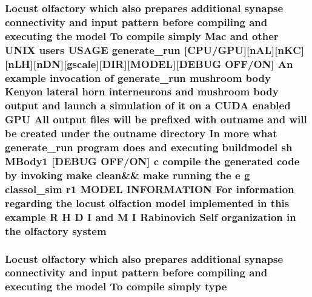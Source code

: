 \hypertarget{userproject_2MBody1__project_2README_8txt_a72470cf24c5ff00591114dd965291668}{
\subsubsection[{system}]{\setlength{\rightskip}{0pt plus 5cm}Locust olfactory which also prepares additional synapse connectivity and input pattern before compiling and executing the {\bf model} To compile simply Mac and other U\+N\+I\+X users U\+S\+A\+G\+E {\bf generate\+\_\+run} \mbox{[}{\bf C\+P\+U}/{\bf G\+P\+U}\mbox{]}\mbox{[}n\+A\+L\mbox{]}\mbox{[}n\+K\+C\mbox{]}\mbox{[}n\+L\+H\mbox{]}\mbox{[}n\+D\+N\mbox{]}\mbox{[}gscale\mbox{]}\mbox{[}D\+I\+R\mbox{]}\mbox{[}M\+O\+D\+E\+L\mbox{]}\mbox{[}D\+E\+B\+U\+G O\+F\+F/O\+N\mbox{]} An example invocation of {\bf generate\+\_\+run} mushroom body Kenyon lateral horn {\bf interneurons} and mushroom body output and launch a simulation of {\bf it} on a C\+U\+D\+A enabled {\bf G\+P\+U} All output files will be prefixed {\bf with} outname and will be created under the outname {\bf directory} In more what {\bf generate\+\_\+run} program does and executing buildmodel sh M\+Body1 \mbox{[}D\+E\+B\+U\+G O\+F\+F/O\+N\mbox{]} c compile the generated {\bf code} by invoking make clean\&\& make running the e g classol\+\_\+sim r1 M\+O\+D\+E\+L I\+N\+F\+O\+R\+M\+A\+T\+I\+O\+N For information regarding the locust olfaction {\bf model} implemented {\bf in} this example {\bf R} H D I and M I Rabinovich Self organization {\bf in} the olfactory system}}\label{userproject_2MBody1__project_2README_8txt_a72470cf24c5ff00591114dd965291668}
\hypertarget{userproject_2MBody1__project_2README_8txt_a01ddd328249dc8dd3d89a7bd34ff048e}{
\subsubsection[{type}]{\setlength{\rightskip}{0pt plus 5cm}Locust olfactory which also prepares additional synapse connectivity and input pattern before compiling and executing the {\bf model} To compile simply type}}\label{userproject_2MBody1__project_2README_8txt_a01ddd328249dc8dd3d89a7bd34ff048e}
